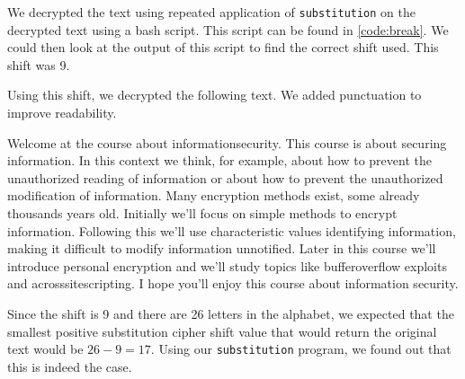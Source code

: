 We decrypted the text using repeated application of \lstinline{substitution} on the decrypted text using a bash script. This script can be found in \autoref{code:break}. We could then look at the output of this script to find the correct shift used. This shift was 9. 

Using this shift, we decrypted the following text. We added punctuation to improve readability. 

Welcome at the course about informationsecurity. This course is about securing information. In this context we think, for example, about how to prevent the unauthorized reading of information or about how to prevent the unauthorized modification of information. Many encryption methods exist, some already thousands years old. Initially we'll focus on simple methods to encrypt information. Following this we'll use characteristic values identifying information, making it difficult to modify information unnotified. Later in this course we'll introduce personal encryption and we'll study topics like bufferoverflow exploits and acrosssitescripting. I hope you'll enjoy this course about information security.



Since the shift is 9 and there are 26 letters in the alphabet, we expected that the smallest positive substitution cipher shift value that would return the original text would be $26 - 9 = 17$. Using our \lstinline{substitution} program, we found out that this is indeed the case.

